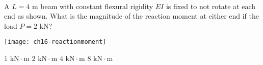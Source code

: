 \variant
\\
\begin{minipage}[t]{3in}
A $L=4\text{ m}$ beam with constant flexural rigidity $EI$ is fixed to not rotate at each end as shown. What is the magnitude of the reaction moment at either end if the load $P = 2\text{ kN}$?
\end{minipage}
\quad
\begin{minipage}[t]{3in}
\vspace{-12pt}
\texttt{[image: ch16-reactionmoment]}
\end{minipage}
\vspace{-24pt}
\begin{answers}
\correctanswer $1\text{ kN}\cdot\text{m}$
\answer $2\text{ kN}\cdot\text{m}$
\answer $4\text{ kN}\cdot\text{m}$
\answer $8\text{ kN}\cdot\text{m}$
\end{answers}
